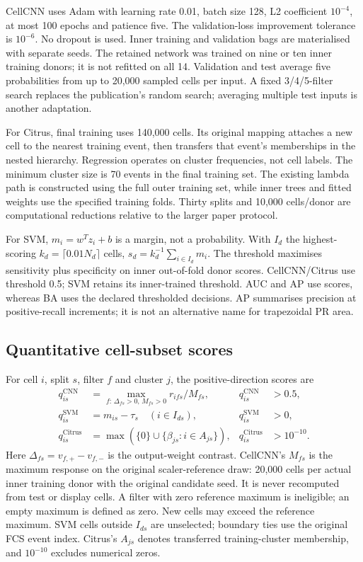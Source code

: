 \documentclass[11pt,a4paper]{article}
\begin{document}
CellCNN uses Adam with learning rate 0.01, batch size 128, L2 coefficient $10^{-4}$, at most 100 epochs and patience five. The validation-loss improvement tolerance is $10^{-6}$. No dropout is used. Inner training and validation bags are materialised with separate seeds. The retained network was trained on nine or ten inner training donors; it is not refitted on all 14. Validation and test average five probabilities from up to 20,000 sampled cells per input. A fixed 3/4/5-filter search replaces the publication's random search; averaging multiple test inputs is another adaptation.

For Citrus, final training uses 140,000 cells. Its original mapping attaches a new cell to the nearest training event, then transfers that event's memberships in the nested hierarchy. Regression operates on cluster frequencies, not cell labels. The minimum cluster size is 70 events in the final training set. The existing lambda path is constructed using the full outer training set, while inner trees and fitted weights use the specified training folds. Thirty splits and 10,000 cells/donor are computational reductions relative to the larger paper protocol.

For SVM, $m_i=w^Tz_i+b$ is a margin, not a probability. With $I_d$ the highest-scoring $k_d=\lceil0.01N_d\rceil$ cells, $s_d=k_d^{-1}\sum_{i\in I_d}m_i$. The threshold maximises sensitivity plus specificity on inner out-of-fold donor scores. CellCNN/Citrus use threshold 0.5; SVM retains its inner-trained threshold. AUC and AP use scores, whereas BA uses the declared thresholded decisions. AP summarises precision at positive-recall increments; it is not an alternative name for trapezoidal PR area.

\subsection{Quantitative cell-subset scores}
For cell $i$, split $s$, filter $f$ and cluster $j$, the positive-direction scores are
\[
\begin{aligned}
q^{\mathrm{CNN}}_{is}&=\max_{f:\,\Delta_{fs}>0,\,M_{fs}>0}r_{ifs}/M_{fs}, &q^{\mathrm{CNN}}_{is}&>0.5,\\
q^{\mathrm{SVM}}_{is}&=m_{is}-\tau_s\quad(i\in I_{ds}), &q^{\mathrm{SVM}}_{is}&>0,\\
q^{\mathrm{Citrus}}_{is}&=\max(\{0\}\cup\{\beta_{js}:i\in A_{js}\}), &q^{\mathrm{Citrus}}_{is}&>10^{-10}.
\end{aligned}
\]
Here $\Delta_{fs}=v_{f,+}-v_{f,-}$ is the output-weight contrast. CellCNN's $M_{fs}$ is the maximum response on the original scaler-reference draw: 20,000 cells per actual inner training donor with the original candidate seed. It is never recomputed from test or display cells. A filter with zero reference maximum is ineligible; an empty maximum is defined as zero. New cells may exceed the reference maximum. SVM cells outside $I_{ds}$ are unselected; boundary ties use the original FCS event index. Citrus's $A_{js}$ denotes transferred training-cluster membership, and $10^{-10}$ excludes numerical zeros.
\end{document}
